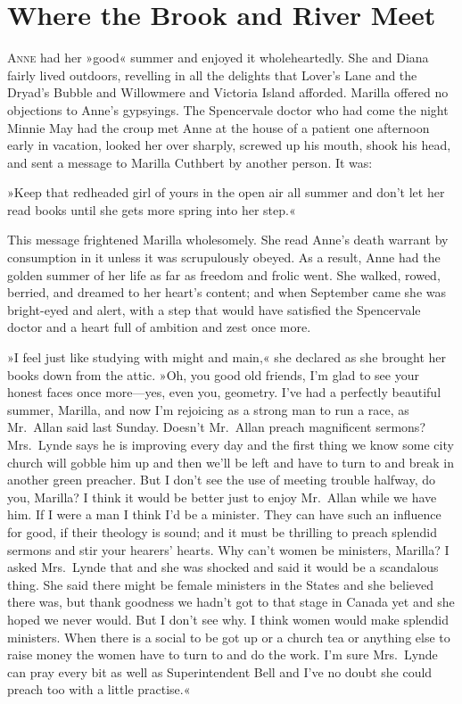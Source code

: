 \chapter{Where the Brook and River Meet}

\lettrine[lines=4]{A}{nne} had her »good« summer and enjoyed it wholeheartedly. She and Diana fairly lived outdoors, revelling in all the delights that Lover's Lane and the Dryad's Bubble and Willowmere and Victoria Island afforded. Marilla offered no objections to Anne's gypsyings. The Spencervale doctor who had come the night Minnie May had the croup met Anne at the house of a patient one afternoon early in vacation, looked her over sharply, screwed up his mouth, shook his head, and sent a message to Marilla Cuthbert by another person. It was:

»Keep that redheaded girl of yours in the open air all summer and don't let her read books until she gets more spring into her step.«

This message frightened Marilla wholesomely. She read Anne's death warrant by consumption in it unless it was scrupulously obeyed. As a result, Anne had the golden summer of her life as far as freedom and frolic went. She walked, rowed, berried, and dreamed to her heart's content; and when September came she was bright-eyed and alert, with a step that would have satisfied the Spencervale doctor and a heart full of ambition and zest once more.

»I feel just like studying with might and main,« she declared as she brought her books down from the attic. »Oh, you good old friends, I'm glad to see your honest faces once more—yes, even you, geometry. I've had a perfectly beautiful summer, Marilla, and now I'm rejoicing as a strong man to run a race, as Mr.~Allan said last Sunday. Doesn't Mr.~Allan preach magnificent sermons? Mrs.~Lynde says he is improving every day and the first thing we know some city church will gobble him up and then we'll be left and have to turn to and break in another green preacher. But I don't see the use of meeting trouble halfway, do you, Marilla? I think it would be better just to enjoy Mr.~Allan while we have him. If I were a man I think I'd be a minister. They can have such an influence for good, if their theology is sound; and it must be thrilling to preach splendid sermons and stir your hearers' hearts. Why can't women be ministers, Marilla? I asked Mrs.~Lynde that and she was shocked and said it would be a scandalous thing. She said there might be female ministers in the States and she believed there was, but thank goodness we hadn't got to that stage in Canada yet and she hoped we never would. But I don't see why. I think women would make splendid ministers. When there is a social to be got up or a church tea or anything else to raise money the women have to turn to and do the work. I'm sure Mrs.~Lynde can pray every bit as well as Superintendent Bell and I've no doubt she could preach too with a little practise.«

